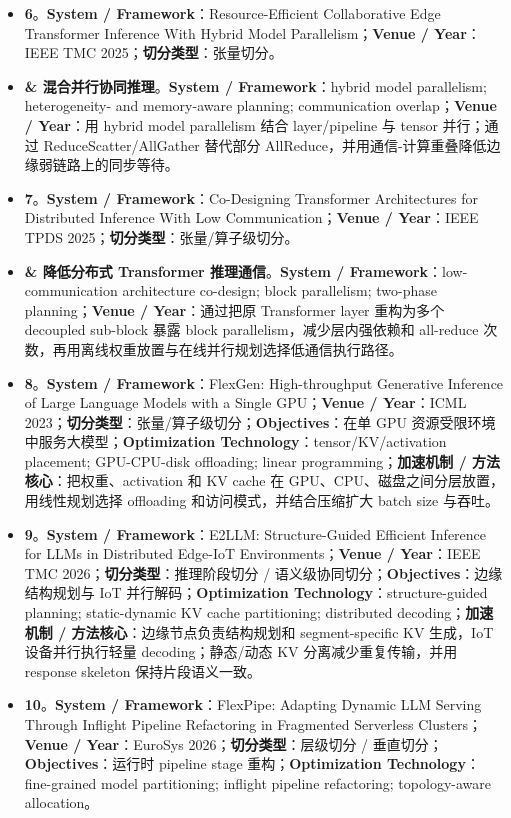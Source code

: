 \documentclass[a4paper,twocolumn,10pt]{ctexart}
\begin{document}
\begin{itemize}
\item \textbf{6}。\textbf{System / Framework}：Resource-Efficient Collaborative Edge Transformer Inference With Hybrid Model Parallelism；\textbf{Venue / Year}：IEEE TMC 2025；\textbf{切分类型}：张量切分。
\item \textbf{\& 混合并行协同推理}。\textbf{System / Framework}：hybrid model parallelism; heterogeneity- and memory-aware planning; communication overlap；\textbf{Venue / Year}：用 hybrid model parallelism 结合 layer/pipeline 与 tensor 并行；通过 ReduceScatter/AllGather 替代部分 AllReduce，并用通信-计算重叠降低边缘弱链路上的同步等待。
\item \textbf{7}。\textbf{System / Framework}：Co-Designing Transformer Architectures for Distributed Inference With Low Communication；\textbf{Venue / Year}：IEEE TPDS 2025；\textbf{切分类型}：张量/算子级切分。
\item \textbf{\& 降低分布式 Transformer 推理通信}。\textbf{System / Framework}：low-communication architecture co-design; block parallelism; two-phase planning；\textbf{Venue / Year}：通过把原 Transformer layer 重构为多个 decoupled sub-block 暴露 block parallelism，减少层内强依赖和 all-reduce 次数，再用离线权重放置与在线并行规划选择低通信执行路径。
\item \textbf{8}。\textbf{System / Framework}：FlexGen: High-throughput Generative Inference of Large Language Models with a Single GPU；\textbf{Venue / Year}：ICML 2023；\textbf{切分类型}：张量/算子级切分；\textbf{Objectives}：在单 GPU 资源受限环境中服务大模型；\textbf{Optimization Technology}：tensor/KV/activation placement; GPU-CPU-disk offloading; linear programming；\textbf{加速机制 / 方法核心}：把权重、activation 和 KV cache 在 GPU、CPU、磁盘之间分层放置，用线性规划选择 offloading 和访问模式，并结合压缩扩大 batch size 与吞吐。
\item \textbf{9}。\textbf{System / Framework}：E2LLM: Structure-Guided Efficient Inference for LLMs in Distributed Edge-IoT Environments；\textbf{Venue / Year}：IEEE TMC 2026；\textbf{切分类型}：推理阶段切分 / 语义级协同切分；\textbf{Objectives}：边缘结构规划与 IoT 并行解码；\textbf{Optimization Technology}：structure-guided planning; static-dynamic KV cache partitioning; distributed decoding；\textbf{加速机制 / 方法核心}：边缘节点负责结构规划和 segment-specific KV 生成，IoT 设备并行执行轻量 decoding；静态/动态 KV 分离减少重复传输，并用 response skeleton 保持片段语义一致。
\item \textbf{10}。\textbf{System / Framework}：FlexPipe: Adapting Dynamic LLM Serving Through Inflight Pipeline Refactoring in Fragmented Serverless Clusters；\textbf{Venue / Year}：EuroSys 2026；\textbf{切分类型}：层级切分 / 垂直切分；\textbf{Objectives}：运行时 pipeline stage 重构；\textbf{Optimization Technology}：fine-grained model partitioning; inflight pipeline refactoring; topology-aware allocation。

\end{itemize}
\end{document}
